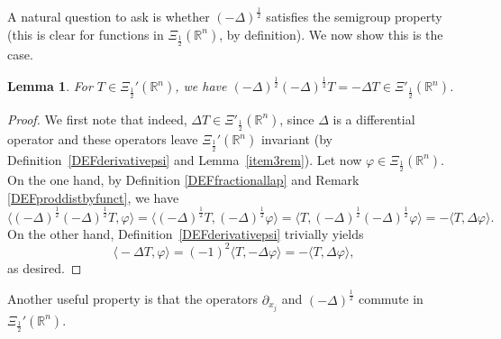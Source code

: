 \documentclass[reqno,11pt]{amsart}
\newtheorem{lemma}[theorem]{Lemma}
\theoremstyle{definition}
\def\R{\mathbb{R}}
\begin{document}
A natural question to ask is whether $(-\Delta)^\frac{1}{2}$ satisfies the semigroup property (this is clear for functions in $\Xi_\frac{1}{2}(\R^n)$, by definition). We now show this is the case.
\begin{lemma}
	\label{LEMsemigroup}
	For $T \in \Xi_\frac{1}{2}'(\R^n)$, we have $(-\Delta)^\frac{1}{2}(-\Delta)^\frac{1}{2}T=-\Delta T\in \Xi'_{\frac{1}{2}}(\R^n)$.
\end{lemma}
\begin{proof}
	We first note that indeed, $\Delta T\in \Xi'_{\frac{1}{2}}(\R^n)$, since $\Delta$ is a differential operator and these operators leave $\Xi_\frac{1}{2}'(\R^n)$ invariant (by Definition~\ref{DEFderivativepsi} and Lemma~\ref{item3rem}). Let now $\varphi\in \Xi_\frac{1}{2}(\R^n)$. On the one hand, by Definition \ref{DEFfractionallap} and Remark \ref{DEFproddistbyfunct}, we have
	\[
	\big\langle (-\Delta)^\frac{1}{2}(-\Delta)^\frac{1}{2} T,\varphi\big\rangle = \big \langle (-\Delta)^\frac{1}{2} T,  (-\Delta)^\frac{1}{2}\varphi\big\rangle = \big\langle   T,  (-\Delta)^\frac{1}{2}(-\Delta)^\frac{1}{2}\varphi\big\rangle = -\langle T,\Delta \varphi \rangle.
	\]
	On the other hand, Definition~\ref{DEFderivativepsi} trivially yields
	\[
	\big\langle -\Delta T,\varphi\big\rangle = (-1)^2\big\langle  T,-\Delta\varphi\big\rangle = -\big\langle  T,\Delta\varphi\big\rangle ,
	\]
	as desired.
\end{proof}



Another useful property is that the operators $\partial_{x_j}$ and $ (-\Delta)^{\frac{1}{2}}$ commute in $\Xi_\frac{1}{2}'(\R^n)$.
\end{document}
